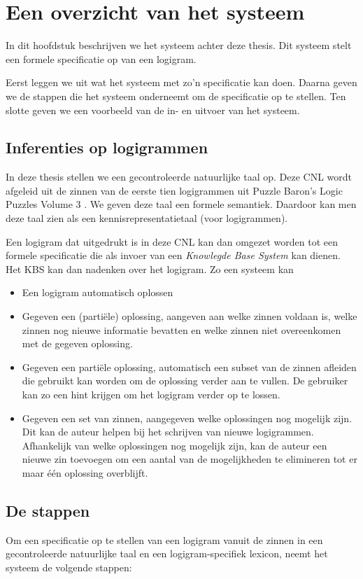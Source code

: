 \chapter{Een overzicht van het systeem}

In dit hoofdstuk beschrijven we het systeem achter deze thesis. Dit systeem stelt een formele specificatie op van een logigram.

Eerst leggen we uit wat het systeem met zo'n specificatie kan doen. Daarna geven we de stappen die het systeem onderneemt om de specificatie op te stellen. Ten slotte geven we een voorbeeld van de in- en uitvoer van het systeem.

\section{Inferenties op logigrammen}
In deze thesis stellen we een gecontroleerde natuurlijke taal op. Deze CNL wordt afgeleid uit de zinnen van de eerste tien logigrammen uit Puzzle Baron's Logic Puzzles Volume 3 \cite{logigrammen}. We geven deze taal een formele semantiek. Daardoor kan men deze taal zien als een kennisrepresentatietaal (voor logigrammen).

Een logigram dat uitgedrukt is in deze CNL kan dan omgezet worden tot een formele specificatie die als invoer van een \textit{Knowlegde Base System} kan dienen. Het KBS kan dan nadenken over het logigram. Zo een systeem kan

\begin{itemize}
  \item Een logigram automatisch oplossen
  \item Gegeven een (partiële) oplossing, aangeven aan welke zinnen voldaan is, welke zinnen nog nieuwe informatie bevatten en welke zinnen niet overeenkomen met de gegeven oplossing.
  \item Gegeven een partiële oplossing, automatisch een subset van de zinnen afleiden die gebruikt kan worden om de oplossing verder aan te vullen. De gebruiker kan zo een hint krijgen om het logigram verder op te lossen.
  \item Gegeven een set van zinnen, aangegeven welke oplossingen nog mogelijk zijn. Dit kan de auteur helpen bij het schrijven van nieuwe logigrammen. Afhankelijk van welke oplossingen nog mogelijk zijn, kan de auteur een nieuwe zin toevoegen om een aantal van de mogelijkheden te elimineren tot er maar één oplossing overblijft.
\end{itemize}

\section{De stappen}
Om een specificatie op te stellen van een logigram vanuit de zinnen in een gecontroleerde natuurlijke taal en een logigram-specifiek lexicon, neemt het systeem de volgende stappen:


